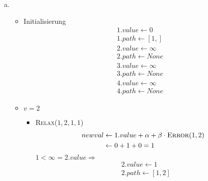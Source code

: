\documentclass[a4paper]{scrartcl}
\begin{document}
\begin{enumerate}[(a)]
    \item
        \begin{itemize}
            \item Initialisierung
                \begin{align*}
                    & 1.value \gets 0 \\
                    & 1.path \gets [1,] \\
                    & 2.value \gets \infty \\
                    & 2.path \gets None \\
                    & 3.value \gets \infty \\
                    & 3.path \gets None \\
                    & 4.value \gets \infty \\
                    & 4.path \gets None
                \end{align*}

            \item $v = 2$
                \begin{itemize}
                    \item \textsc{Relax}($1, 2, 1, 1$) \\
                        \begin{equation*}
                            \begin{split}
                                newval &\gets 1.value + \alpha + \beta \cdot \textsc{Error}(1, 2) \\
                                &\gets 0 + 1 + 0 = 1
                            \end{split}
                        \end{equation*}
                        $1 < \infty = 2.value \Rightarrow$
                        \begin{align*}
                            & 2.value \gets 1 \\
                            & 2.path \gets [1, 2]
                        \end{align*}
                \end{itemize}


\end{itemize}
\end{enumerate}
\end{document}
